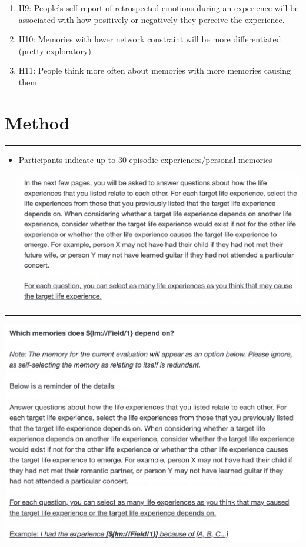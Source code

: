 \documentclass[
  .7em,
  letterpaper,
  DIV=11,
  numbers=noendperiod]{scrartcl}
\begin{document}
\begin{enumerate}
\def\labelenumi{\arabic{enumi}.}
\setcounter{enumi}{8}
\item
  H9: People's self-report of retrospected emotions during an experience
  will be associated with how positively or negatively they perceive the
  experience.
\item
  H10: Memories with lower network constraint will be more
  differentiated. (pretty exploratory)
\item
  H11: People think more often about memories with more memories causing
  them
\end{enumerate}

\hypertarget{method}{%
\section{Method}\label{method}}

\begin{center}\rule{0.5\linewidth}{0.5pt}\end{center}

\begin{itemize}
\item
  Participants indicate up to 30 episodic experiences/personal memories

  \includegraphics{images/Screen Shot 2023-01-27 at 10.23.58 PM.png}
\end{itemize}

\begin{center}\rule{0.5\linewidth}{0.5pt}\end{center}

\includegraphics{images/Screen Shot 2023-01-27 at 10.25.35 PM.png}
\end{document}
